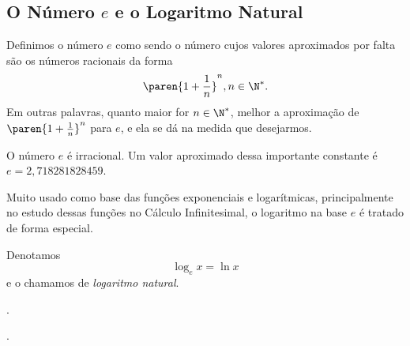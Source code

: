 \subsection{O Número $e$ e o Logaritmo Natural}

\begin{definition}
Definimos o número $e$ como sendo o número cujos valores aproximados
por falta são os números racionais da forma $$
\paren{1+ \frac 1 n}^n , n\in \N^*.$$ Em outras palavras, quanto
maior for $n \in \N^*$, melhor a aproximação de $\paren{1+ \frac
1 n}^n$ para $e$, e ela se dá na medida que desejarmos.
\end{definition}

\begin{remark}
O número $e$ é irracional. Um valor aproximado dessa importante
constante é $e = 2{,}718281828459$.
\end{remark}

Muito usado como base das funções exponenciais e logarítmicas,
principalmente no estudo dessas funções no Cálculo Infinitesimal, o
logaritmo na base $e$ é tratado de forma especial.

\begin{definition}
Denotamos $$\log_e x = \ln x$$ e o chamamos de \emph{logaritmo
natural}.
\end{definition}

\begin{onlineact}
	.
\end{onlineact}

\begin{onlineact}
	.
\end{onlineact}